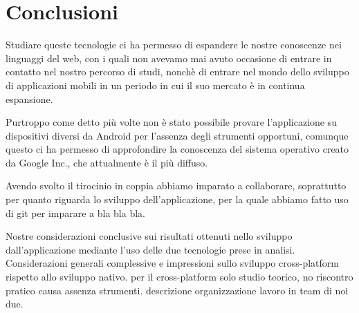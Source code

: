 \chapter{Conclusioni}
	Studiare queste tecnologie ci ha permesso di espandere le nostre
	conoscenze nei linguaggi del web, con i quali non avevamo mai avuto
	occasione di entrare in contatto nel nostro percorso di studi, nonchè di
	entrare nel mondo dello sviluppo di applicazioni mobili in un periodo in
	cui il suo mercato è in continua espansione.
	
	Purtroppo come detto più volte non è stato possibile provare
	l'applicazione su dispositivi diversi da Android per l'assenza degli
	strumenti opportuni, comunque questo ci ha permesso di approfondire la
	conoscenza del sistema operativo creato da Google Inc., che attualmente è
	il più diffuso.

	Avendo svolto il tirocinio in coppia abbiamo imparato a collaborare,
	soprattutto per quanto riguarda lo sviluppo dell'applicazione, per la
	quale abbiamo fatto uso di git per imparare a bla bla bla. 
	
	Nostre considerazioni conclusive sui risultati ottenuti nello sviluppo 
	dall'applicazione mediante l'uso delle due tecnologie prese in analisi. 
	Considerazioni generali complessive e impressioni sullo sviluppo 
	cross-platform rispetto allo sviluppo nativo.
	per il cross-platform solo studio teorico, no riscontro pratico causa assenza
	strumenti.
	descrizione organizzazione lavoro in team di noi due.
